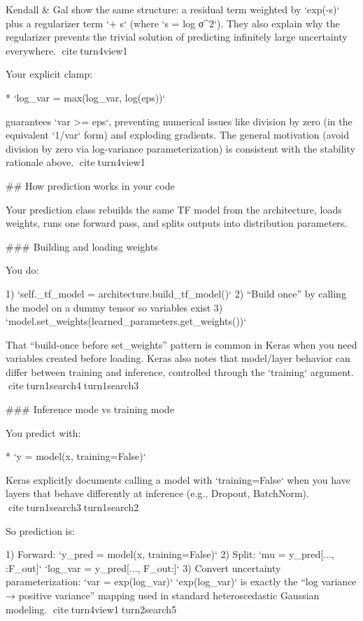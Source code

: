 \documentclass[a4paper]{article}
\begin{document}
    Kendall & Gal show the same structure: a residual term weighted by `exp(-s)` plus a regularizer term `+ s` (where `s = log σ^2`). They also explain why the regularizer prevents the trivial solution of predicting infinitely large uncertainty everywhere. citeturn4view1
    
    Your explicit clamp:
    
    * `log_var = max(log_var, log(eps))`
    
    guarantees `var >= eps`, preventing numerical issues like division by zero (in the equivalent `1/var` form) and exploding gradients. The general motivation (avoid division by zero via log-variance parameterization) is consistent with the stability rationale above. citeturn4view1
    
    ## How prediction works in your code
    
    Your prediction class rebuilds the same TF model from the architecture, loads weights, runs one forward pass, and splits outputs into distribution parameters.
    
    ### Building and loading weights
    
    You do:
    
    1) `self._tf_model = architecture.build_tf_model()`
    2) “Build once” by calling the model on a dummy tensor so variables exist
    3) `model.set_weights(learned_parameters.get_weights())`
    
    That “build-once before set_weights” pattern is common in Keras when you need variables created before loading. Keras also notes that model/layer behavior can differ between training and inference, controlled through the `training` argument. citeturn1search4turn1search3
    
    ### Inference mode vs training mode
    
    You predict with:
    
    * `y = model(x, training=False)`
    
    Keras explicitly documents calling a model with `training=False` when you have layers that behave differently at inference (e.g., Dropout, BatchNorm). citeturn1search3turn1search2
    
    So prediction is:
    
    1) Forward: `y_pred = model(x, training=False)`
    2) Split:
       `mu = y_pred[..., :F_out]`
       `log_var = y_pred[..., F_out:]`
    3) Convert uncertainty parameterization: `var = exp(log_var)`
    `exp(log_var)` is exactly the “log variance → positive variance” mapping used in standard heteroscedastic Gaussian modeling. citeturn4view1turn2search5
    
\end{document}
